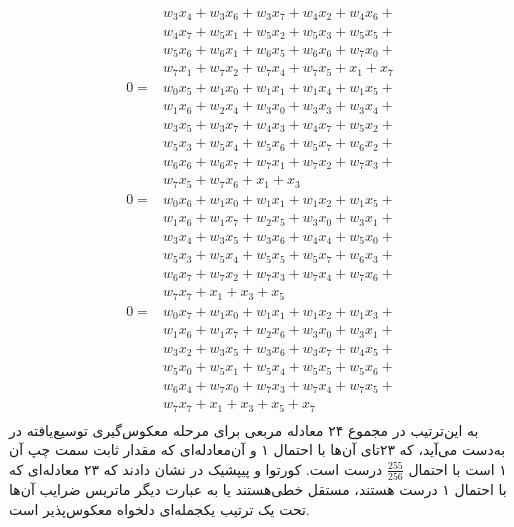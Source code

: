 \begin{equation*}
{\begin{split}
	&w_{3} x_{4} + w_{3} x_{6} + w_{3} x_{7} + w_{4} x_{2} + w_{4} x_{6} +\\
	&w_{4} x_{7} + w_{5} x_{1} + w_{5} x_{2} + w_{5} x_{3} + w_{5} x_{5} +\\
	&w_{5} x_{6} + w_{6} x_{1} + w_{6} x_{5} + w_{6} x_{6} + w_{7} x_{0} +\\
	&w_{7} x_{1} + w_{7} x_{2} + w_{7} x_{4} + w_{7} x_{5} + x_{1} + x_{7}\\
	0 =& w_{0} x_{5} + w_{1} x_{0} + w_{1} x_{1} + w_{1} x_{4} + w_{1} x_{5} +\\
	&w_{1} x_{6} + w_{2} x_{4} + w_{3} x_{0} + w_{3} x_{3} + w_{3} x_{4} +\\
	&w_{3} x_{5} + w_{3} x_{7} + w_{4} x_{3} + w_{4} x_{7} + w_{5} x_{2} +\\
	&w_{5} x_{3} + w_{5} x_{4} + w_{5} x_{6} + w_{5} x_{7} + w_{6} x_{2} +\\
	&w_{6} x_{6} + w_{6} x_{7} + w_{7} x_{1} + w_{7} x_{2} + w_{7} x_{3} +\\
	&w_{7} x_{5} + w_{7} x_{6} + x_{1} + x_{3}\\
	0 =& w_{0} x_{6} + w_{1} x_{0} + w_{1} x_{1} + w_{1} x_{2} + w_{1} x_{5} +\\
	&w_{1} x_{6} + w_{1} x_{7} + w_{2} x_{5} + w_{3} x_{0} + w_{3} x_{1} +\\
	&w_{3} x_{4} + w_{3} x_{5} + w_{3} x_{6} + w_{4} x_{4} + w_{5} x_{0} +\\
	&w_{5} x_{3} + w_{5} x_{4} + w_{5} x_{5} + w_{5} x_{7} + w_{6} x_{3} +\\
	&w_{6} x_{7} + w_{7} x_{2} + w_{7} x_{3} + w_{7} x_{4} + w_{7} x_{6} +\\
	&w_{7} x_{7} + x_{1} + x_{3} + x_{5}\\
	0 =& w_{0} x_{7} + w_{1} x_{0} + w_{1} x_{1} + w_{1} x_{2} + w_{1} x_{3} +\\
	&w_{1} x_{6} + w_{1} x_{7} + w_{2} x_{6} + w_{3} x_{0} + w_{3} x_{1} +\\
	&w_{3} x_{2} + w_{3} x_{5} + w_{3} x_{6} + w_{3} x_{7} + w_{4} x_{5} +\\
	&w_{5} x_{0} + w_{5} x_{1} + w_{5} x_{4} + w_{5} x_{5} + w_{5} x_{6} +\\
	&w_{6} x_{4} + w_{7} x_{0} + w_{7} x_{3} + w_{7} x_{4} + w_{7} x_{5} +\\
	&w_{7} x_{7} + x_{1} + x_{3} + x_{5} + x_{7}\\
	\end{split}}
\end{equation*}
به این‌ترتیب در مجموع ۲۴ معادله مربعی برای مرحله معکوس‌گیری توسیع‌یافته در 
به‌دست می‌آید، که ۲۳تای آن‌ها با احتمال ۱ و آن‌معادله‌ای که مقدار ثابت سمت چپ آن ۱ است با احتمال 
$\frac{255}{256}$
درست است.  کورتوا و پیپشیک در 
\cite{courtois2002cryptanalysis}
نشان دادند  که ۲۳ معادله‌ای که با احتمال ۱ درست هستند، مستقل خطی‌هستند یا به عبارت دیگر ماتریس ضرایب آن‌ها تحت یک ترتیب یکجمله‌ای دلخواه معکوس‌پذیر است. 

